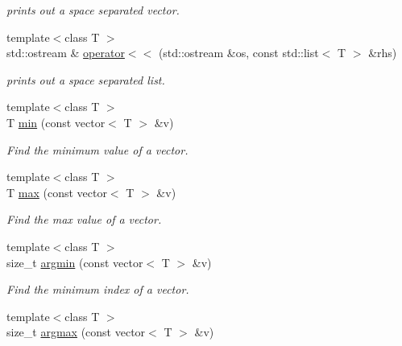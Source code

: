 \begin{DoxyCompactItemize}
\begin{DoxyCompactList}\small\item\em prints out a space separated vector. \end{DoxyCompactList}\item 
\hypertarget{namespacedscr_ad048e1932f53867f8cd2f40d2482b4a8}{{\footnotesize template$<$class T $>$ }\\std\-::ostream \& \hyperlink{namespacedscr_ad048e1932f53867f8cd2f40d2482b4a8}{operator$<$$<$} (std\-::ostream \&os, const std\-::list$<$ T $>$ \&rhs)}\label{namespacedscr_ad048e1932f53867f8cd2f40d2482b4a8}

\begin{DoxyCompactList}\small\item\em prints out a space separated list. \end{DoxyCompactList}\item 
\hypertarget{namespacedscr_ad9d19b6c54c9fbf5ef4ae28216dcdb72}{{\footnotesize template$<$class T $>$ }\\T \hyperlink{namespacedscr_ad9d19b6c54c9fbf5ef4ae28216dcdb72}{min} (const vector$<$ T $>$ \&v)}\label{namespacedscr_ad9d19b6c54c9fbf5ef4ae28216dcdb72}

\begin{DoxyCompactList}\small\item\em Find the minimum value of a vector. \end{DoxyCompactList}\item 
\hypertarget{namespacedscr_ab38d8fcbf59878404231b13d2c04cdb4}{{\footnotesize template$<$class T $>$ }\\T \hyperlink{namespacedscr_ab38d8fcbf59878404231b13d2c04cdb4}{max} (const vector$<$ T $>$ \&v)}\label{namespacedscr_ab38d8fcbf59878404231b13d2c04cdb4}

\begin{DoxyCompactList}\small\item\em Find the max value of a vector. \end{DoxyCompactList}\item 
\hypertarget{namespacedscr_a9f1eee1474efcf0ae81d9a3480a7a69a}{{\footnotesize template$<$class T $>$ }\\size\-\_\-t \hyperlink{namespacedscr_a9f1eee1474efcf0ae81d9a3480a7a69a}{argmin} (const vector$<$ T $>$ \&v)}\label{namespacedscr_a9f1eee1474efcf0ae81d9a3480a7a69a}

\begin{DoxyCompactList}\small\item\em Find the minimum index of a vector. \end{DoxyCompactList}\item 
\hypertarget{namespacedscr_a5c516f2e0610b4e9dcdc2377d07a916d}{{\footnotesize template$<$class T $>$ }\\size\-\_\-t \hyperlink{namespacedscr_a5c516f2e0610b4e9dcdc2377d07a916d}{argmax} (const vector$<$ T $>$ \&v)}\label{namespacedscr_a5c516f2e0610b4e9dcdc2377d07a916d}


\end{DoxyCompactItemize}
